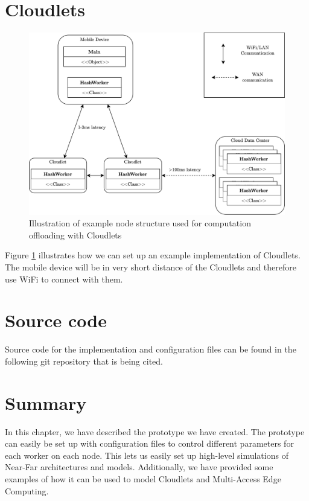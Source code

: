 
\section{Cloudlets}
\begin{figure}[t]
    \centering
    \includegraphics[scale=0.9]{chapters/5_implementation/figures/Cloudlet_implementation.png}
    \caption{Illustration of example node structure used for computation offloading with Cloudlets}
    \label{fig:Cloudlet_implementation}
\end{figure}
Figure \ref{fig:Cloudlet_implementation} illustrates how we can set up an example implementation of Cloudlets. The mobile device will be in very short distance of the Cloudlets and therefore use WiFi to connect with them.






\section{Source code}
Source code for the implementation and configuration files can be found in the following git repository that is being cited\cite{johnsen_daniejohmasterprograms_nodate}.






\section{Summary}
In this chapter, we have described the prototype we have created. The prototype can easily be set up with configuration files to control different parameters for each worker on each node. This lets us easily set up high-level simulations of Near-Far architectures and models. Additionally, we have provided some examples of how it can be used to model Cloudlets and Multi-Access Edge Computing.